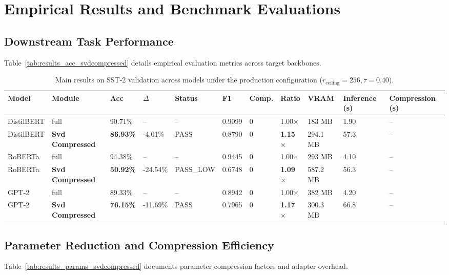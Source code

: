 \section{Empirical Results and Benchmark Evaluations}

\subsection{Downstream Task Performance}
Table~\ref{tab:results_acc_svdcompressed} details empirical evaluation metrics across target backbones.

\begin{table}[t]
\centering
\small
\begin{tabular}{lllllllllll}
\toprule
\textbf{Model} & \textbf{Module} & \textbf{Acc} & \textbf{$\Delta$} & \textbf{Status} & \textbf{F1} & \textbf{Comp.} & \textbf{Ratio} & \textbf{VRAM} & \textbf{Inference (s)} & \textbf{Compression (s)} \\
\midrule
DistilBERT & full & 90.71\% & -- & -- & 0.9099 & 0 & 1.00$\times$ & 183 MB & 1.90 & -- \\
DistilBERT & \textbf{Svd Compressed} & \textbf{86.93\%} & -4.01\% & PASS & 0.8790 & 0 & \textbf{1.15$\times$} & 294.1 MB & 57.3 & -- \\
RoBERTa & full & 94.38\% & -- & -- & 0.9445 & 0 & 1.00$\times$ & 293 MB & 4.10 & -- \\
RoBERTa & \textbf{Svd Compressed} & \textbf{50.92\%} & -24.54\% & PASS\_LOW & 0.6748 & 0 & \textbf{1.09$\times$} & 587.2 MB & 56.3 & -- \\
GPT-2 & full & 89.33\% & -- & -- & 0.8942 & 0 & 1.00$\times$ & 382 MB & 4.20 & -- \\
GPT-2 & \textbf{Svd Compressed} & \textbf{76.15\%} & -11.69\% & PASS & 0.7965 & 0 & \textbf{1.17$\times$} & 300.3 MB & 66.8 & -- \\
\bottomrule
\end{tabular}
\caption{Main results on SST-2 validation across models under the production configuration ($r_{\mathrm{ceiling}}=256, \tau=0.40$).}
\label{tab:main_sst2}
\end{table}

\subsection{Parameter Reduction and Compression Efficiency}
Table~\ref{tab:results_params_svdcompressed} documents parameter compression factors and adapter overhead.

